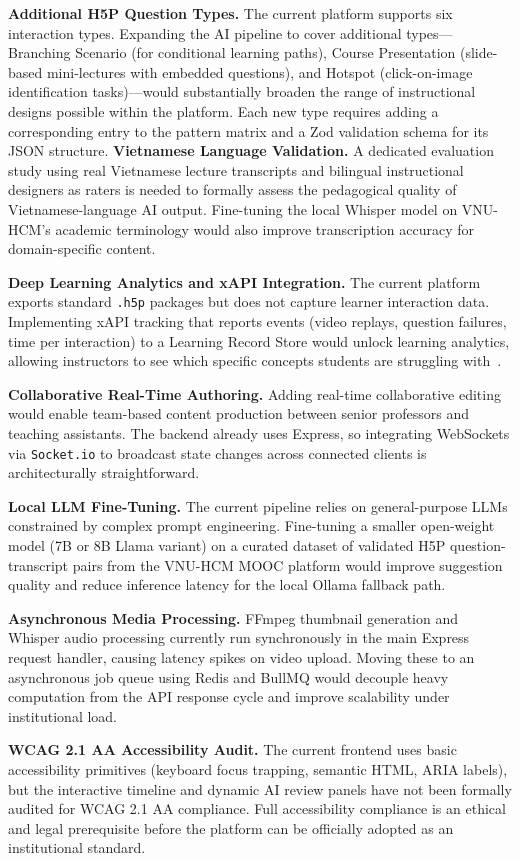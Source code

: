 \textbf{Additional H5P Question Types.} The current platform supports six interaction types. Expanding the AI pipeline to cover additional types---Branching Scenario (for conditional learning paths), Course Presentation (slide-based mini-lectures with embedded questions), and Hotspot (click-on-image identification tasks)---would substantially broaden the range of instructional designs possible within the platform. Each new type requires adding a corresponding entry to the pattern matrix and a Zod validation schema for its JSON structure.
\clearpage
\textbf{Vietnamese Language Validation.} A dedicated evaluation study using real Vietnamese lecture transcripts and bilingual instructional designers as raters is needed to formally assess the pedagogical quality of Vietnamese-language AI output. Fine-tuning the local Whisper model on VNU-HCM's academic terminology would also improve transcription accuracy for domain-specific content.

\textbf{Deep Learning Analytics and xAPI Integration.} The current platform exports standard \texttt{.h5p} packages but does not capture learner interaction data. Implementing xAPI tracking that reports events (video replays, question failures, time per interaction) to a Learning Record Store would unlock learning analytics, allowing instructors to see which specific concepts students are struggling with~\cite{siemens2011}.

\textbf{Collaborative Real-Time Authoring.} Adding real-time collaborative editing would enable team-based content production between senior professors and teaching assistants. The backend already uses Express, so integrating WebSockets via \texttt{Socket.io} to broadcast state changes across connected clients is architecturally straightforward.

\textbf{Local LLM Fine-Tuning.} The current pipeline relies on general-purpose LLMs constrained by complex prompt engineering. Fine-tuning a smaller open-weight model (7B or 8B Llama variant) on a curated dataset of validated H5P question-transcript pairs from the VNU-HCM MOOC platform would improve suggestion quality and reduce inference latency for the local Ollama fallback path.

\textbf{Asynchronous Media Processing.} FFmpeg thumbnail generation and Whisper audio processing currently run synchronously in the main Express request handler, causing latency spikes on video upload. Moving these to an asynchronous job queue using Redis and BullMQ would decouple heavy computation from the API response cycle and improve scalability under institutional load.

\textbf{WCAG 2.1 AA Accessibility Audit.} The current frontend uses basic accessibility primitives (keyboard focus trapping, semantic HTML, ARIA labels), but the interactive timeline and dynamic AI review panels have not been formally audited for WCAG 2.1 AA compliance. Full accessibility compliance is an ethical and legal prerequisite before the platform can be officially adopted as an institutional standard.
